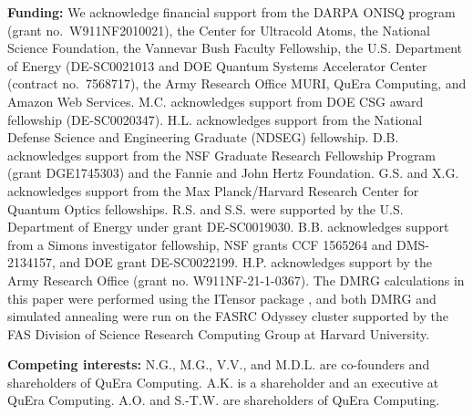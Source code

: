 \documentclass[twocolumn,amssymb,secnumarabic, prl, aps, nofootinbib]{revtex4-1}
\begin{document}
\textbf{Funding:} We acknowledge financial support from the DARPA ONISQ program (grant no.\ W911NF2010021), the Center for Ultracold Atoms, the National Science Foundation, the Vannevar Bush Faculty Fellowship, the U.S. Department of Energy (DE-SC0021013 and DOE Quantum Systems Accelerator Center (contract no.\ 7568717), 
the Army Research Office MURI, QuEra Computing, and Amazon Web Services. M.C. acknowledges support from DOE CSG award fellowship (DE-SC0020347). H.L. acknowledges support from the National Defense Science and Engineering Graduate (NDSEG) fellowship. D.B. acknowledges support from the NSF Graduate Research Fellowship Program (grant DGE1745303) and the Fannie and John Hertz Foundation. G.S. and  X.G. acknowledges support from the Max Planck/Harvard Research Center for Quantum Optics fellowships. R.S. and S.S. were supported by the U.S. Department of Energy under grant DE-SC0019030. B.B. acknowledges support from  %
a Simons investigator fellowship, NSF grants CCF 1565264 and DMS-2134157, and DOE grant DE-SC0022199. H.P. acknowledges support by the Army Research Office (grant no. W911NF-21-1-0367). The DMRG calculations in this paper were performed using the ITensor package \cite{itensor}, and both DMRG and simulated annealing were run on the FASRC Odyssey cluster supported by the FAS Division of Science Research Computing Group at Harvard University. 


\textbf{Competing interests:} N.G., M.G., V.V., and M.D.L. are co-founders and shareholders of QuEra Computing. A.K. is a shareholder and an executive at QuEra Computing. A.O. and S.-T.W. are shareholders of QuEra Computing.



\newpage
\end{document}
